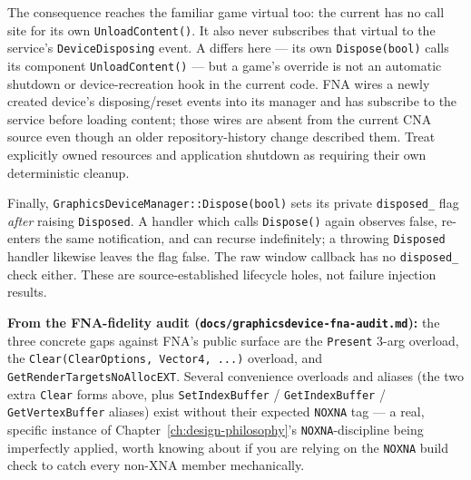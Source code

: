 The consequence reaches the familiar game virtual too: the current  has no call
site for its own \texttt{UnloadContent()}. It also never subscribes that virtual to the service's
\texttt{DeviceDisposing} event. A  differs here --- its own
\texttt{Dispose(bool)} calls its component \texttt{UnloadContent()} --- but a game's override is
not an automatic shutdown or device-recreation hook in the current code. FNA wires a newly
created device's disposing/reset events into its manager and has  subscribe to
the service before loading content; those wires are absent from the current CNA source even
though an older repository-history change described them. Treat explicitly owned resources and
application shutdown as requiring their own deterministic cleanup.

Finally, \texttt{GraphicsDeviceManager::Dispose(bool)} sets its private \texttt{disposed\_} flag
\emph{after} raising \texttt{Disposed}. A handler which calls \texttt{Dispose()} again observes
false, re-enters the same notification, and can recurse indefinitely; a throwing
\texttt{Disposed} handler likewise leaves the flag false. The raw window callback has no
\texttt{disposed\_} check either. These are source-established lifecycle holes, not failure
injection results.

\begin{sourcenote}
\textbf{From the FNA-fidelity audit (\texttt{docs/graphicsdevice-fna-audit.md}):} the three
concrete gaps against FNA's public surface are the \texttt{Present} 3-arg overload, the
\texttt{Clear(ClearOptions, Vector4, ...)} overload, and \texttt{GetRenderTargetsNoAllocEXT}.
Several convenience overloads and aliases (the two extra \texttt{Clear} forms above, plus
\texttt{SetIndexBuffer} / \texttt{GetIndexBuffer} / \texttt{GetVertexBuffer} aliases) exist without
their expected \texttt{NOXNA} tag --- a real, specific instance of
Chapter~\ref{ch:design-philosophy}'s \texttt{NOXNA}-discipline being imperfectly applied, worth
knowing about if you are relying on the \texttt{NOXNA} build check to catch every non-XNA
member mechanically.
\end{sourcenote}


